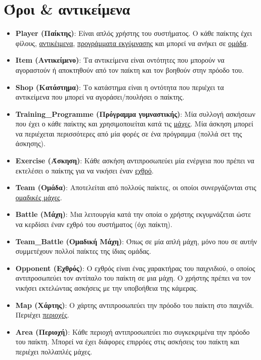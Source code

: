 \section{Όροι \& αντικείμενα}

\begin{itemize}
    \item \textbf{Player (Παίκτης)}: Είναι απλός χρήστης του συστήματος. Ο κάθε παίκτης έχει φίλους, \underline{αντικέιμενα}, \underline{προγράμματα εκγύμνασης} και μπορεί να ανήκει σε \underline{ομάδα}.
    \item \textbf{Item (Αντικείμενο)}: Τα αντικείμενα είναι οντότητες που μπορούν να αγοραστούν ή αποκτηθούν από τον παίκτη και τον βοηθούν στην πρόοδο του.
    \item \textbf{Shop (Κατάστημα)}: Το κατάστημα είναι η οντότητα που περιέχει τα αντικείμενα που μπορεί να αγοράσει/πουλήσει ο παίκτης.
    \item \textbf{Training\_Programme (Πρόγραμμα γυμναστικής)}: Μία συλλογή ασκήσεων που έχει ο κάθε παίκτης και χρησιμοποιείται κατά τις \underline{μάχες}. Μία άσκηση μπορεί να περιέχεται περισσότερες από μία φορές σε ένα πρόγραμμα (πολλά σετ της άσκησης).
    \item \textbf{Exercise (Άσκηση)}: Κάθε ασκήση αντιπροσωπεύει μία ενέργεια που πρέπει να εκτελέσει ο παίκτης για να νικήσει έναν \underline{εχθρό}.
    \item \textbf{Team (Ομάδα)}: Αποτελείται από πολλούς παίκτες, οι οποίοι συνεργάζονται στις \underline{ομαδικές μάχες}.
    \item \textbf{Battle (Μάχη)}: Μια λειτουργία κατά την οποία ο χρήστης εκγυμνάζεται ώστε να κερδίσει έναν εχθρό του συστήματος (όχι παίκτη).
    \item \textbf{Team\_Battle (Ομαδική Μάχη)}: Όπως σε μία απλή μάχη, μόνο που σε αυτήν συμμετέχουν πολλοί παίκτες της ίδιας ομάδας.
    \item \textbf{Opponent (Εχθρός)}: Ο εχθρός είναι ένας χαρακτήρας του παιχνιδιού, ο οποίος αντιπροσωπεύει τον αντίπαλο του παίκτη σε μια μάχη. Ο χρήστης πρέπει να τον νικήσει εκτελώντας ασκήσεις με την υποβοήθεια της κάμερας.
    \item \textbf{Map (Χάρτης)}: Ο χάρτης αντιπροσωπεύει την πρόοδο του παίκτη στο παιχνίδι. Περιέχει \underline{περιοχές}.
    \item \textbf{Area (Περιοχή)}: Κάθε περιοχή αντιπροσωπεύει πιο συγκεκριμένα την πρόοδο του παίκτη. Μπορεί να έχει διάφορες επιρρόες στις ασκήσεις του παίκτη και περιέχει πολλαπλές μάχες.
\end{itemize}
